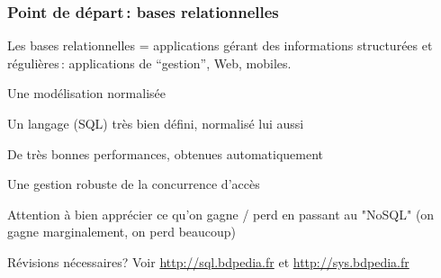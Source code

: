 \begin{frame}
\frametitle{Point de départ\,: bases relationnelles}

Les \alert{bases relationnelles} = applications
gérant des informations \alert{structurées} et \alert{régulières}\,: 
applications de ``gestion'',
 Web,  mobiles.

\vfill

\begin{redbullet}
  \item Une modélisation normalisée
  \item Un langage (SQL) très bien défini, normalisé lui aussi
  \item De très bonnes performances, obtenues \alert{automatiquement}
  \item Une gestion robuste de la concurrence d'accès
\end{redbullet}


\vfill

\alert{Attention à bien apprécier ce qu'on gagne / perd en passant au "NoSQL"} (on gagne
marginalement, on perd beaucoup)

\vfill
\begin{blocgauche}
Révisions nécessaires? Voir  \url{http://sql.bdpedia.fr} et \url{http://sys.bdpedia.fr}
\end{blocgauche}

\end{frame}

